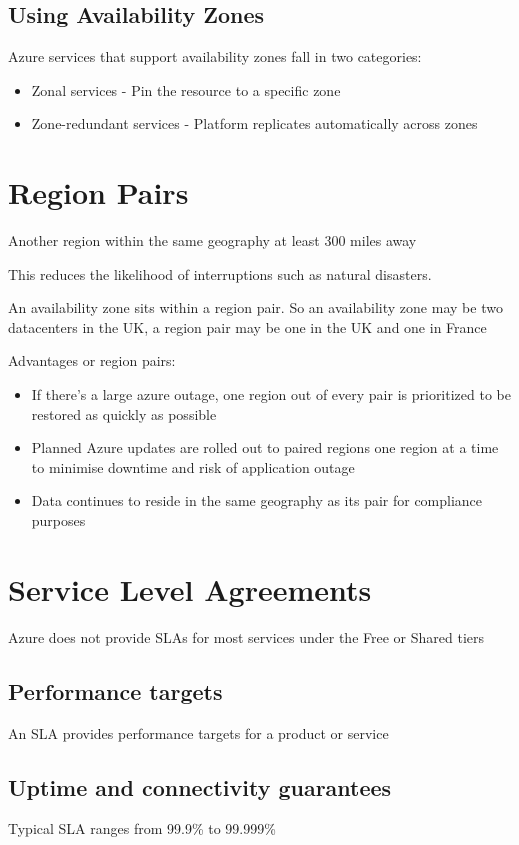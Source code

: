 \documentclass{article}[18pt]
\begin{document}
\subsection{Using Availability Zones}
Azure services that support availability zones fall in two categories:
\begin{itemize}
	\item Zonal services - Pin the resource to a specific zone
	\item Zone-redundant services - Platform replicates automatically across zones
\end{itemize}
\section{Region Pairs}
\begin{definition}
 	Another region within the same geography at least 300 miles away
\end{definition}
This reduces the likelihood of interruptions such as natural disasters.
\begin{important}
	An availability zone sits within a region pair. So an availability zone may be two datacenters in the UK, a region pair may be one in the UK and one in France
\end{important}
Advantages or region pairs:
\begin{itemize}
	\item If there's a large azure outage, one region out of every pair is prioritized to be restored as quickly as possible
	\item Planned Azure updates are rolled out to paired regions one region at a time to minimise downtime and risk of application outage
	\item Data continues to reside in the same geography as its pair for compliance purposes
\end{itemize}
\section{Service Level Agreements}
\begin{important}
	Azure does not provide SLAs for most services under the Free or Shared tiers
\end{important}
\subsection{Performance targets}
An SLA provides performance targets for a product or service
\subsection{Uptime and connectivity guarantees}
Typical SLA ranges from 99.9\% to 99.999\%
\end{document}
